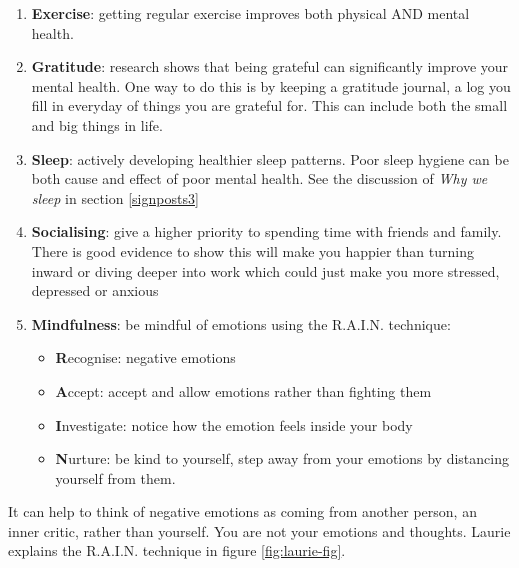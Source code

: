 \documentclass[
]{book}
\providecommand{\tightlist}{%
  \setlength{\itemsep}{0pt}\setlength{\parskip}{0pt}}
\begin{document}
\begin{enumerate}
\def\labelenumi{\arabic{enumi}.}
\tightlist
\item
  \textbf{Exercise}: getting regular exercise improves both physical AND mental health.
\item
  \textbf{Gratitude}: research shows that being grateful can significantly improve your mental health. One way to do this is by keeping a gratitude journal, a log you fill in everyday of things you are grateful for. This can include both the small and big things in life.
\item
  \textbf{Sleep}: actively developing healthier sleep patterns. Poor sleep hygiene can be both cause and effect of poor mental health. See the discussion of \emph{Why we sleep} \citep{whywesleep} in section \ref{signposts3}
\item
  \textbf{Socialising}: give a higher priority to spending time with friends and family. There is good evidence to show this will make you happier than turning inward or diving deeper into work which could just make you more stressed, depressed or anxious \citep{lauranxiety}
\item
  \textbf{Mindfulness}: be mindful of emotions using the R.A.I.N. technique:

  \begin{itemize}
  \tightlist
  \item
    \textbf{R}ecognise: negative emotions
  \item
    \textbf{A}ccept: accept and allow emotions rather than fighting them
  \item
    \textbf{I}nvestigate: notice how the emotion feels inside your body
  \item
    \textbf{N}urture: be kind to yourself, step away from your emotions by distancing yourself from them.
  \end{itemize}
\end{enumerate}

It can help to think of negative emotions as coming from another person, an inner critic, rather than yourself. You are not your emotions and thoughts. Laurie explains the R.A.I.N. technique in figure \ref{fig:laurie-fig}.
\end{document}
